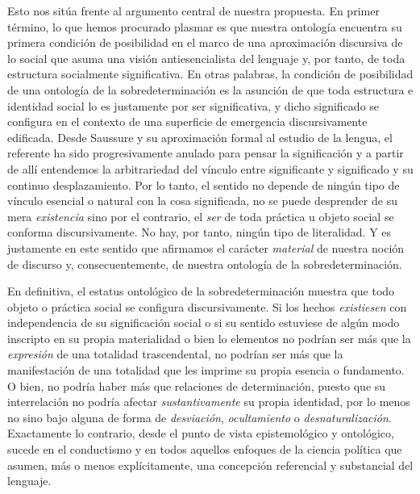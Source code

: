 Esto nos sitúa frente al argumento central de nuestra propuesta. En primer término, lo que hemos procurado plasmar es que nuestra ontología encuentra su primera condición de posibilidad en el marco de una aproximación discursiva de lo social que asuma una visión antiesencialista del lenguaje y, por tanto, de toda estructura socialmente significativa. En otras palabras, la condición de posibilidad de una ontología de la sobredeterminación es la asunción de que toda estructura e identidad social lo es justamente por ser significativa, y dicho significado se configura en el contexto de una superficie de emergencia discursivamente edificada. Desde Saussure y su aproximación formal al estudio de la lengua, el referente ha sido progresivamente anulado para pensar la significación y a partir de allí entendemos la arbitrariedad del vínculo entre significante y significado y su continuo desplazamiento. Por lo tanto, el sentido no depende de ningún tipo de vínculo esencial o natural con la cosa significada, no se puede desprender de su mera \emph{existencia}  sino por el contrario, el \emph{ser} de toda práctica u objeto social se conforma discursivamente. No hay, por tanto, ningún tipo de literalidad. Y es justamente en este sentido que afirmamos el carácter \emph{material} de nuestra noción de discurso y, consecuentemente, de nuestra ontología de la sobredeterminación.

En definitiva, el estatus ontológico de la sobredeterminación muestra que todo objeto o práctica social se configura discursivamente. Si los hechos \emph{existiesen} con independencia de su significación social o si su sentido estuviese de algún modo inscripto en su propia materialidad  o bien lo elementos no podrían ser más que la \emph{expresión} de una totalidad trascendental, no podrían ser más que la manifestación de una totalidad que les imprime su propia esencia o fundamento. O bien, no podría haber más que relaciones de determinación, puesto que su interrelación no podría afectar \emph{sustantivamente} su propia identidad, por lo menos no sino bajo alguna de forma de \emph{desviación}, \emph{ocultamiento} o \emph{desnaturalización}. Exactamente lo contrario, desde el punto de vista epistemológico y ontológico, sucede en el conductismo y en todos aquellos enfoques de la ciencia política que asumen, más o menos explícitamente, una concepción referencial y substancial del lenguaje.

